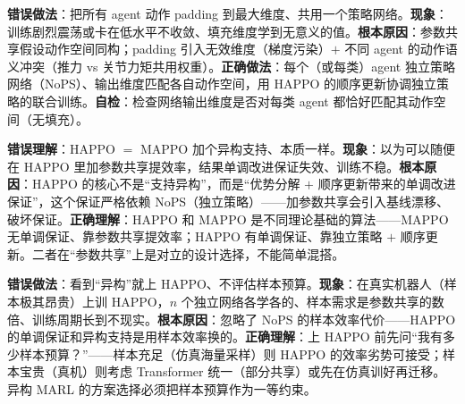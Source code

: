 \begin{pitfall}
\textbf{错误做法}：把所有 agent 动作 padding 到最大维度、共用一个策略网络。\textbf{现象}：训练剧烈震荡或卡在低水平不收敛、填充维度学到无意义的值。\textbf{根本原因}：参数共享假设动作空间同构；padding 引入无效维度（梯度污染）$+$ 不同 agent 的动作语义冲突（推力 vs 关节力矩共用权重）。\textbf{正确做法}：每个（或每类）agent 独立策略网络（NoPS）、输出维度匹配各自动作空间，用 HAPPO 的顺序更新协调独立策略的联合训练。\textbf{自检}：检查网络输出维度是否对每类 agent 都恰好匹配其动作空间（无填充）。
\end{pitfall}

\begin{pitfall}
\textbf{错误理解}：HAPPO $=$ MAPPO 加个异构支持、本质一样。\textbf{现象}：以为可以随便在 HAPPO 里加参数共享提效率，结果单调改进保证失效、训练不稳。\textbf{根本原因}：HAPPO 的核心不是“支持异构”，而是“优势分解 $+$ 顺序更新带来的单调改进保证”，这个保证严格依赖 NoPS（独立策略）——加参数共享会引入基线漂移、破坏保证。\textbf{正确理解}：HAPPO 和 MAPPO 是不同理论基础的算法——MAPPO 无单调保证、靠参数共享提效率；HAPPO 有单调保证、靠独立策略 $+$ 顺序更新。二者在“参数共享”上是对立的设计选择，不能简单混搭。
\end{pitfall}

\begin{pitfall}
\textbf{错误做法}：看到“异构”就上 HAPPO、不评估样本预算。\textbf{现象}：在真实机器人（样本极其昂贵）上训 HAPPO，$n$ 个独立网络各学各的、样本需求是参数共享的数倍、训练周期长到不现实。\textbf{根本原因}：忽略了 NoPS 的样本效率代价——HAPPO 的单调保证和异构支持是用样本效率换的。\textbf{正确理解}：上 HAPPO 前先问“我有多少样本预算？”——样本充足（仿真海量采样）则 HAPPO 的效率劣势可接受；样本宝贵（真机）则考虑 Transformer 统一（部分共享）或先在仿真训好再迁移。异构 MARL 的方案选择必须把样本预算作为一等约束。
\end{pitfall}


